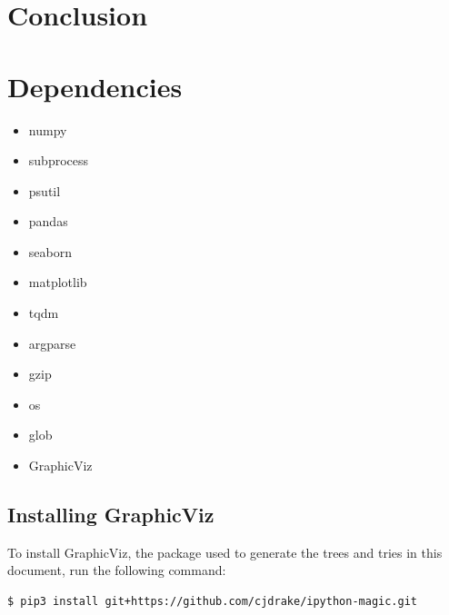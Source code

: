 \documentclass[11pt, letterpaper]{article}
\begin{document}
\subsection{}

\subsection{}

\subsection{}


\subsection{}

\section{Conclusion}

\section{Dependencies}
\begin{itemize}
  \item numpy
  \item subprocess
  \item psutil
  \item pandas
  \item seaborn
  \item matplotlib
  \item tqdm
  \item argparse
  \item gzip
  \item os 
  \item glob
  \item GraphicViz
\end{itemize}

\subsection{Installing GraphicViz}
To install GraphicViz, the package used to generate the trees and tries in this document, run the following command:
\begin{verbatim}
$ pip3 install git+https://github.com/cjdrake/ipython-magic.git
\end{verbatim}
\end{document}
